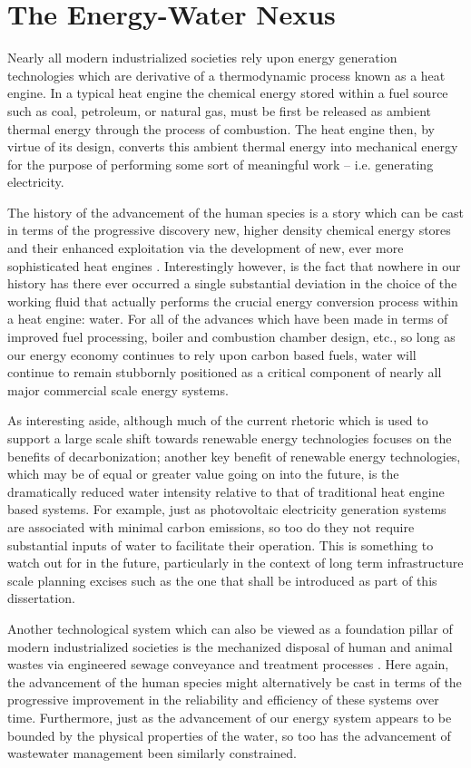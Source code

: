 \section{The Energy-Water Nexus}
  
Nearly all modern industrialized societies rely upon energy generation technologies which are derivative of a thermodynamic process known as a heat engine. In a typical heat engine the chemical energy stored within a fuel source such as coal, petroleum, or natural gas, must be first be released as ambient thermal energy through the process of combustion. The heat engine then, by virtue of its design, converts this ambient thermal energy into mechanical energy for the purpose of performing some sort of meaningful work -- i.e. generating electricity.
    
The history of the advancement of the human species is a story which can be cast in terms of the progressive discovery new, higher density chemical energy stores and their enhanced exploitation via the development of new, ever more sophisticated heat engines \cite{Grubler2003,Grubler2010}. Interestingly however, is the fact that nowhere in our history has there ever occurred a single substantial deviation in the choice of the working fluid that actually performs the crucial energy conversion process within a heat engine: water. For all of the advances which have been made in terms of improved fuel processing, boiler and combustion chamber design, etc., so long as our energy economy continues to rely upon carbon based fuels, water will continue to remain stubbornly positioned as a critical component of nearly all major commercial scale energy systems.
    
As interesting aside, although much of the current rhetoric which is used to support a large scale shift towards renewable energy technologies focuses on the benefits of decarbonization; another key benefit of renewable energy technologies, which may be of equal or greater value going on into the future, is the dramatically reduced water intensity relative to that of traditional heat engine based systems. For example, just as photovoltaic electricity generation systems are associated with minimal carbon emissions, so too do they not require substantial inputs of water to facilitate their operation. This is something to watch out for in the future, particularly in the context of long term infrastructure scale planning excises such as the one that shall be introduced as part of this dissertation.
        
Another technological system which can also be viewed as a foundation pillar of modern industrialized societies is the mechanized disposal of human and animal wastes via engineered sewage conveyance and treatment processes \cite{Angelakis2014}. Here again, the advancement of the human species might alternatively be cast in terms of the progressive improvement in the reliability and efficiency of these systems over time. Furthermore, just as the advancement of our energy system appears to be bounded by the physical properties of the water, so too has the advancement of wastewater management been similarly constrained. 
        
